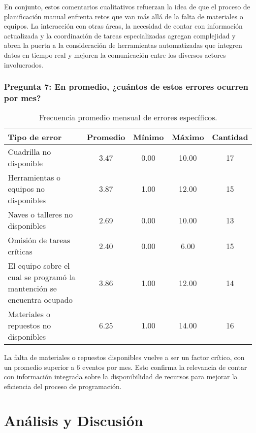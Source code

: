 \documentclass{article}
\begin{document}
En conjunto, estos comentarios cualitativos refuerzan la idea de que el proceso de planificación manual enfrenta retos que van más allá de la falta de materiales o equipos. La interacción con otras áreas, la necesidad de contar con información actualizada y la coordinación de tareas especializadas agregan complejidad y abren la puerta a la consideración de herramientas automatizadas que integren datos en tiempo real y mejoren la comunicación entre los diversos actores involucrados.

\subsubsection*{Pregunta 7: En promedio, ¿cuántos de estos errores ocurren por mes?}

\begin{table}[H]
    \centering
    \begin{tabular}{p{7cm}cccc}
        \toprule
        \textbf{Tipo de error} & \textbf{Promedio} & \textbf{Mínimo} & \textbf{Máximo} & \textbf{Cantidad} \\
        \midrule
        Cuadrilla no disponible & 3.47 & 0.00 & 10.00 & 17 \\
        Herramientas o equipos no disponibles & 3.87 & 1.00 & 12.00 & 15 \\
        Naves o talleres no disponibles & 2.69 & 0.00 & 10.00 & 13 \\
        Omisión de tareas críticas & 2.40 & 0.00 & 6.00 & 15 \\
        El equipo sobre el cual se programó la mantención se encuentra ocupado & 3.86 & 1.00 & 12.00 & 14 \\
        Materiales o repuestos no disponibles & 6.25 & 1.00 & 14.00 & 16 \\
        \bottomrule
    \end{tabular}
    \caption{Frecuencia promedio mensual de errores específicos.}
    \label{tab:errores_especificos}
\end{table}

La falta de materiales o repuestos disponibles vuelve a ser un factor crítico, con un promedio superior a 6 eventos por mes. Esto confirma la relevancia de contar con información integrada sobre la disponibilidad de recursos para mejorar la eficiencia del proceso de programación.
\section*{Análisis y Discusión}
\end{document}
